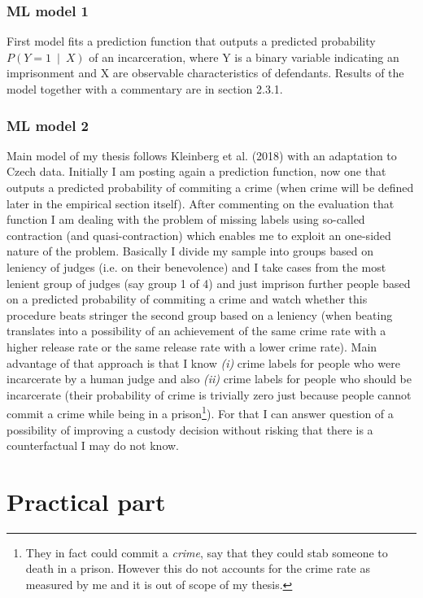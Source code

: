 \documentclass[12pt, twoside]{book} %
\begin{document}
\subsection{ML model 1}
First model fits a prediction function that outputs a predicted probability $P(Y=1~\mid~ X)$ of an incarceration, where Y is a binary variable indicating an imprisonment and X are observable characteristics of defendants. Results of the model together with a commentary are in section 2.3.1.

\subsection{ML model 2}
Main model of my thesis follows Kleinberg et al. (2018) with an adaptation to Czech data. Initially I am posting again a prediction function, now one that outputs a predicted probability of commiting a crime (when crime will be defined later in the empirical section itself). After commenting on the evaluation that function I am dealing with the problem of missing labels using so-called contraction (and quasi-contraction) which enables me to exploit an one-sided nature of the problem. Basically I divide my sample into groups based on leniency of judges (i.e. on their benevolence) and I take cases from the most lenient group of judges (say group 1 of 4) and just imprison further people based on a predicted probability of commiting a crime and watch whether this procedure beats stringer the second group based on a leniency (when beating translates into a possibility of an achievement of the same crime rate with a higher release rate or the same release rate with a lower crime rate). Main advantage of that approach is that I know \textit{(i)} crime labels for people who were incarcerate by a human judge and also \textit{(ii)} crime labels for people who should be incarcerate (their probability of crime is trivially zero just because people cannot commit a crime while being in a prison\footnote{They in fact could commit a \textit{crime}, say that they could stab someone to death in a prison. However this do not accounts for the crime rate as measured by me and it is out of scope of my thesis.}). For that I can answer question of a possibility of improving a custody decision without risking that there is a counterfactual I may do not know. \newline






\chapter{Practical part}        %
\label{2}
\end{document}
